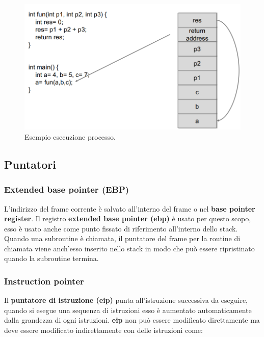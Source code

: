 \begin{figure}[H]
    \centering
    \includegraphics[width=13cm, keepaspectratio]{capitoli/secure_coding/img/cap_2/es_esecuzione_processo.png}
    \caption{Esempio esecuzione processo.}\label{fig:es_esec_processo}
\end{figure}

\subsection{Puntatori}

\subsubsection{Extended base pointer (EBP)}

L'indirizzo del frame corrente è salvato all'interno del frame o
nel \textbf{base pointer register}.
Il registro \textbf{extended base pointer (ebp) } è usato per questo scopo, esso è
usato anche come punto fissato di riferimento all'interno dello stack. Quando una
subroutine è chiamata, il puntatore del frame per la routine di chiamata viene anch'esso
inserito nello stack in modo che può essere ripristinato quando la subroutine termina.

\subsubsection{Instruction pointer}

Il \textbf{puntatore di istruzione (eip)} punta all'istruzione successiva da eseguire,
quando si esegue una sequenza di istruzioni esso è aumentato automaticamente dalla
grandezza di ogni istruzioni. \textbf{eip} non può essere modificato direttamente ma deve
essere modificato indirettamente con delle istruzioni come:

